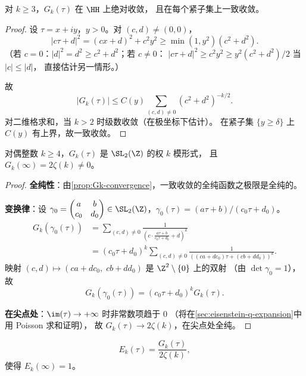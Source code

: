 \begin{proposition}[绝对收敛性]
\label{prop:Gk-convergence}
对 $k \geq 3$，$G_k(\tau)$ 在 $\HH$ 上绝对收敛，
且在每个紧子集上一致收敛。
\end{proposition}

\begin{proof}
设 $\tau = x + iy$，$y > 0$。对 $(c, d) \neq (0, 0)$，
\[
  |c\tau + d|^2 = (cx + d)^2 + c^2 y^2 \geq \min(1, y^2)(c^2 + d^2).
\]
（若 $c = 0$：$|d|^2 = d^2 \geq c^2+d^2$；若 $c \neq 0$：
$|c\tau+d|^2 \geq c^2y^2 \geq y^2(c^2+d^2)/2$ 当 $|c| \leq |d|$，
直接估计另一情形。）

故
\[
  |G_k(\tau)| \leq C(y) \sum_{(c,d) \neq 0} (c^2 + d^2)^{-k/2}.
\]
对二维格求和，当 $k > 2$ 时级数收敛（在极坐标下估计）。
在紧子集 $\{y \geq \delta\}$ 上 $C(y)$ 有上界，故一致收敛。
\end{proof}

\begin{theorem}[$G_k$ 是模形式]
\label{thm:Gk-modular}
对偶整数 $k \geq 4$，$G_k(\tau)$ 是 $\SL_2(\Z)$ 的权 $k$ 模形式，
且 $G_k(\infty) = 2\zeta(k) \neq 0$。
\end{theorem}

\begin{proof}
\textbf{全纯性}：由\cref{prop:Gk-convergence}，一致收敛的全纯函数之极限是全纯的。

\textbf{变换律}：设 $\gamma_0 = \begin{pmatrix} a & b \\ c_0 & d_0 \end{pmatrix}
\in \SL_2(\Z)$，$\gamma_0(\tau) = (a\tau + b)/(c_0\tau + d_0)$。
\begin{align}
  G_k(\gamma_0(\tau))
  &= \sum_{(c,d) \neq 0} \frac{1}{\!\left(c \cdot \frac{a\tau+b}{c_0\tau+d_0} + d\right)^{\!k}} \\
  &= (c_0\tau + d_0)^k
     \sum_{(c,d) \neq 0} \frac{1}{((ca + dc_0)\tau + (cb + dd_0))^k}.
\end{align}
映射 $(c, d) \mapsto (ca+dc_0,\; cb+dd_0)$ 是 $\Z^2 \setminus \{0\}$ 上的双射
（由 $\det\gamma_0 = 1$），故
\[
  G_k(\gamma_0(\tau)) = (c_0\tau + d_0)^k G_k(\tau).
\]

\textbf{在尖点处}：$\im(\tau) \to +\infty$ 时非常数项趋于 $0$
（将在\cref{sec:eisenstein-q-expansion}中用 Poisson 求和证明），
故 $G_k(\tau) \to 2\zeta(k)$，在尖点处全纯。
\end{proof}

\begin{definition}
\label{def:normalized-eisenstein}
\[
  E_k(\tau) = \frac{G_k(\tau)}{2\zeta(k)},
\]
使得 $E_k(\infty) = 1$。
\end{definition}

